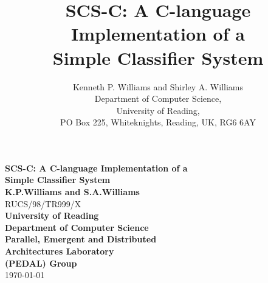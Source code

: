 
 



\oddsidemargin=0.6in
\evensidemargin=0.7in
\setlength{\textwidth}{8in}
\setlength{\headsep}{0in}

 
\begin{titlepage}
  \begin{center}
   
   \large {\bf SCS-C: A C-language Implementation of a}\\
   \large {\bf Simple Classifier System}\\[10mm]

   \large {\bf K.P.Williams and S.A.Williams}\\[7mm]

   \large RUCS/98/TR999/X \\[40mm]
   \Large {\bf University of Reading}\\[3mm]
   \Large {\bf Department of Computer Science}\\[3mm]
   \Large {\bf Parallel, Emergent and Distributed}\\
   \Large {\bf Architectures Laboratory}\\
   \Large {\bf (PEDAL) Group}\\[5mm]
   \large \today\\
  \end{center}
 
\textheight=8in

\end{titlepage}

\oddsidemargin=0.7in
\textwidth=5.0in
\evensidemargin=0.4in
\marginparwidth=71pt


\title{\bf
   \large {\bf SCS-C: A C-language Implementation of a}\\
   \large {\bf Simple Classifier System}
       }
\author{
{\sc Kenneth P. Williams and Shirley A. Williams}   \\
Department of Computer Science, \\
University of Reading, \\
PO Box 225, Whiteknights, Reading, UK, RG6 6AY\\
}
 
\maketitle

